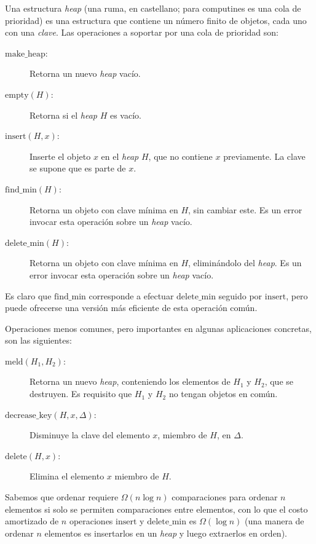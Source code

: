   Una estructura \emph{\foreignlanguage{english}{heap}}
  (una ruma,
   en castellano;
   para computines es una cola de prioridad)
  es una estructura que contiene un número finito de objetos,
  cada uno con una \emph{clave}.
  Las operaciones a soportar por una cola de prioridad son:
  \begin{description}
  \item[\boldmath\(\mathrm{make\_heap}\)\unboldmath:]
    Retorna un nuevo \emph{\foreignlanguage{english}{heap}} vacío.
  \item[\boldmath\(\mathrm{empty}(H)\)\unboldmath:]
    Retorna si el \emph{\foreignlanguage{english}{heap}} \(H\) es vacío.
  \item[\boldmath\(\mathrm{insert}(H, x)\)\unboldmath:]
    Inserte el objeto \(x\)
    en el \emph{\foreignlanguage{english}{heap}} \(H\),
    que no contiene \(x\) previamente.
    La clave se supone que es parte de \(x\).
  \item[\boldmath\(\mathrm{find\_min}(H)\)\unboldmath:]
    Retorna un objeto con clave mínima en \(H\),
    sin cambiar este.
    Es un error invocar esta operación
    sobre un \emph{\foreignlanguage{english}{heap}} vacío.
  \item[\boldmath\(\mathrm{delete\_min}(H)\)\unboldmath:]
    Retorna un objeto con clave mínima en \(H\),
    eliminándolo del \emph{\foreignlanguage{english}{heap}}.
    Es un error invocar esta operación
    sobre un \emph{\foreignlanguage{english}{heap}} vacío.
  \end{description}
  Es claro que \(\mathrm{find\_min}\)
  corresponde a efectuar \(\mathrm{delete\_min}\)
  seguido por \(\mathrm{insert}\),
  pero puede ofrecerse una versión más eficiente de esta operación común.

  Operaciones menos comunes,
  pero importantes en algunas aplicaciones concretas,
  son las siguientes:
  \begin{description}
  \item[\boldmath\(\mathrm{meld}(H_1, H_2)\)\unboldmath:]
    Retorna un nuevo \emph{\foreignlanguage{english}{heap}},
    conteniendo los elementos
    de \(H_1\) y \(H_2\),
    que se destruyen.
    Es requisito que
    \(H_1\) y \(H_2\)
    no tengan objetos en común.
  \item[\boldmath\(\mathrm{decrease\_key}(H, x, \Delta)\)\unboldmath:]
    Disminuye la clave del elemento \(x\),
    miembro de \(H\),
    en \(\Delta\).
  \item[\boldmath\(\mathrm{delete}(H, x)\)\unboldmath:]
    Elimina el elemento \(x\)
    miembro de \(H\).
  \end{description}
  Sabemos que ordenar requiere \(\Omega(n \log n)\) comparaciones
  para ordenar \(n\) elementos
  si solo se permiten comparaciones entre elementos,
  con lo que el costo amortizado
  de \(n\) operaciones \(\mathrm{insert}\)
  y  \(\mathrm{delete\_min}\)
  es \(\Omega(\log n)\)
  (una manera de ordenar \(n\) elementos
   es insertarlos en un \emph{\foreignlanguage{english}{heap}}
   y luego extraerlos en orden).

